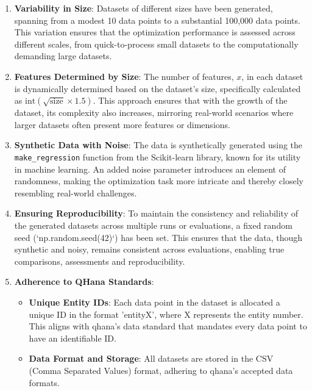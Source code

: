 \documentclass[
  a4paper,  %
  twoside,  %
  bibliography=totoc,
  headsepline,
  cleardoublepage=empty,
  parskip=half,
  draft=false
]{scrbook}
\begin{document}
\begin{enumerate}
    \item \textbf{Variability in Size}: Datasets of different sizes have been generated, spanning from a modest 10 data points to a substantial 100,000 data points.
    This variation ensures that the optimization performance is assessed across different scales, from quick-to-process small datasets to the computationally demanding large datasets.

    \item \textbf{Features Determined by Size}: The number of features, \( x \), in each dataset is dynamically determined based on the dataset's size, specifically calculated as \( \text{int}(\sqrt{\text{size}} \times 1.5) \).
    This approach ensures that with the growth of the dataset, its complexity also increases, mirroring real-world scenarios where larger datasets often present more features or dimensions.

    \item \textbf{Synthetic Data with Noise}: The data is synthetically generated using the \texttt{make\_regression} function from the Scikit-learn library, known for its utility in machine learning.
    An added noise parameter introduces an element of randomness, making the optimization task more intricate and thereby closely resembling real-world challenges.

    \item \textbf{Ensuring Reproducibility}: To maintain the consistency and reliability of the generated datasets across multiple runs or evaluations, a fixed random seed (`np.random.seed(42)`) has been set.
    This ensures that the data, though synthetic and noisy, remains consistent across evaluations, enabling true comparisons, assessments and reproducibility.

    \item \textbf{Adherence to QHana Standards}:
   \begin{itemize}
        \item \textbf{Unique Entity IDs}: Each data point in the dataset is allocated a unique ID in the format 'entityX', where X represents the entity number. This aligns with \gls{qhana}'s data standard that mandates every data point to have an identifiable ID.
        \item \textbf{Data Format and Storage}: All datasets are stored in the CSV (Comma Separated Values) format, adhering to \gls{qhana}'s accepted data formats.
    \end{itemize}
\end{enumerate}
\end{document}
